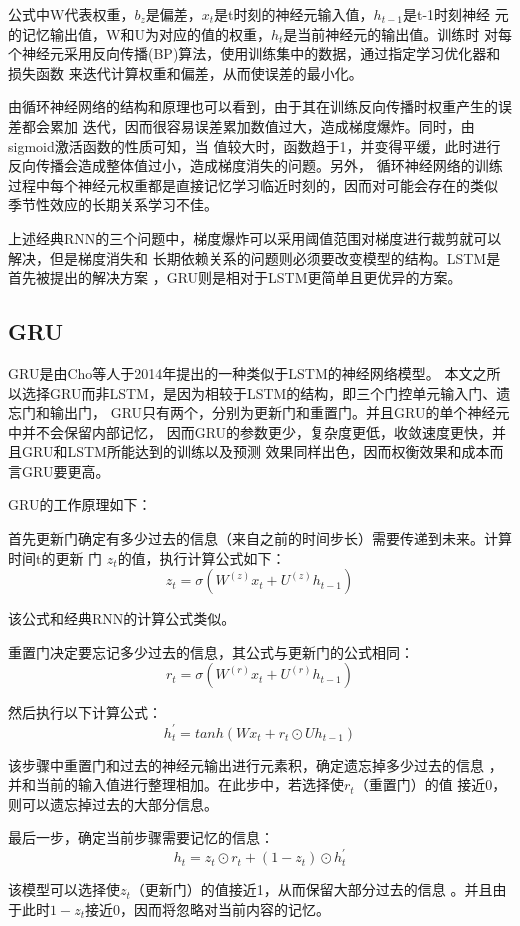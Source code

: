 \documentclass[AutoFakeBold]{LZUThesis}
\begin{document}
公式中W代表权重，$b_z$是偏差，$x_t$是t时刻的神经元输入值，$h_{t-1}$是t-1时刻神经
元的记忆输出值，W和U为对应的值的权重，$h_t$是当前神经元的输出值。训练时
对每个神经元采用反向传播(BP)算法，使用训练集中的数据，通过指定学习优化器和损失函数
来迭代计算权重和偏差，从而使误差的最小化。

由循环神经网络的结构和原理也可以看到，由于其在训练反向传播时权重产生的误差都会累加
迭代，因而很容易误差累加数值过大，造成梯度爆炸。同时，由sigmoid激活函数的性质可知，当
值较大时，函数趋于1，并变得平缓，此时进行反向传播会造成整体值过小，造成梯度消失的问题。另外，
循环神经网络的训练过程中每个神经元权重都是直接记忆学习临近时刻的，因而对可能会存在的类似
季节性效应的长期关系学习不佳。

上述经典RNN的三个问题中，梯度爆炸可以采用阈值范围对梯度进行裁剪就可以解决，但是梯度消失和
长期依赖关系的问题则必须要改变模型的结构。LSTM是首先被提出的解决方案
，GRU则是相对于LSTM更简单且更优异的方案。

\subsection{GRU}
GRU是由Cho等人于2014年提出的一种类似于LSTM的神经网络模型。
本文之所以选择GRU而非LSTM，是因为相较于LSTM的结构，即三个门控单元输入门、遗忘门和输出门，
GRU只有两个，分别为更新门和重置门。并且GRU的单个神经元中并不会保留内部记忆，
因而GRU的参数更少，复杂度更低，收敛速度更快，并且GRU和LSTM所能达到的训练以及预测
效果同样出色，因而权衡效果和成本而言GRU要更高。

GRU的工作原理如下：

首先更新门确定有多少过去的信息（来自之前的时间步长）需要传递到未来。计算时间t的更新
门 $z_t$的值，执行计算公式如下：
$$z_t=\sigma(W^{(z)}x_t+U^{(z)}h_{t-1})$$

该公式和经典RNN的计算公式类似。

重置门决定要忘记多少过去的信息，其公式与更新门的公式相同：
$$r_t=\sigma(W^{(r)}x_t+U^{(r)}h_{t-1})$$

然后执行以下计算公式：
$$h^{\prime}_t=tanh(Wx_t+r_t\odot Uh_{t-1})$$

该步骤中重置门和过去的神经元输出进行元素积，确定遗忘掉多少过去的信息
，并和当前的输入值进行整理相加。在此步中，若选择使$r_t$（重置门）的值
接近0，则可以遗忘掉过去的大部分信息。

最后一步，确定当前步骤需要记忆的信息：
$$h_t=z_t\odot r_t+(1-z_t)\odot h^{\prime}_t$$

该模型可以选择使$z_t$（更新门）的值接近1，从而保留大部分过去的信息
。并且由于此时$1-z_t$接近0，因而将忽略对当前内容的记忆。
\end{document}

